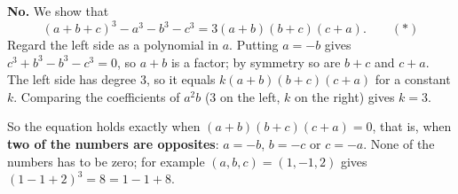 \textbf{No.} We show that
\[
(a+b+c)^3-a^3-b^3-c^3=3(a+b)(b+c)(c+a). \qquad (*)
\]
Regard the left side as a polynomial in $a$. Putting $a=-b$ gives $c^3+b^3-b^3-c^3=0$, so $a+b$ is a factor; by symmetry so are $b+c$ and $c+a$. The left side has degree $3$, so it equals $k(a+b)(b+c)(c+a)$ for a constant $k$. Comparing the coefficients of $a^2b$ ($3$ on the left, $k$ on the right) gives $k=3$.

So the equation holds exactly when $(a+b)(b+c)(c+a)=0$, that is, when \textbf{two of the numbers are opposites}: $a=-b$, $b=-c$ or $c=-a$. None of the numbers has to be zero; for example $(a,b,c)=(1,-1,2)$ gives $(1-1+2)^3=8=1-1+8$.
